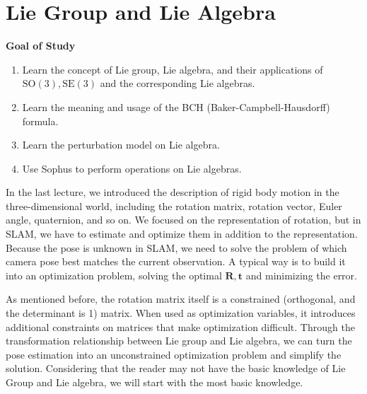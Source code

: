 \chapter{Lie Group and Lie Algebra}
\label{cpt:4}
\begin{mdframed}
    \textbf{Goal of Study}
    \begin{enumerate}
        \item Learn the concept of Lie group, Lie algebra, and their applications of $ \mathrm{SO}( 3 ), \mathrm{SE}( 3 ) $ and the corresponding Lie algebras.
        \item Learn the meaning and usage of the BCH (Baker-Campbell-Hausdorff) formula.
        \item Learn the perturbation model on Lie algebra.
        \item Use Sophus to perform operations on Lie algebras.
    \end{enumerate}
\end{mdframed}

In the last lecture, we introduced the description of rigid body motion in the three-dimensional world, including the rotation matrix, rotation vector, Euler angle, quaternion, and so on. We focused on the representation of rotation, but in SLAM, we have to estimate and optimize them in addition to the representation. Because the pose is unknown in SLAM, we need to solve the problem of which camera pose best matches the current observation. A typical way is to build it into an optimization problem, solving the optimal $ \mathbf{R}, \mathbf{t}$ and minimizing the error.

As mentioned before, the rotation matrix itself is a constrained (orthogonal, and the determinant is 1) matrix. When used as optimization variables, it introduces additional constraints on matrices that make optimization difficult. Through the transformation relationship between Lie group and Lie algebra, we can turn the pose estimation into an unconstrained optimization problem and simplify the solution. Considering that the reader may not have the basic knowledge of Lie Group and Lie algebra, we will start with the most basic knowledge.

\newpage
%

